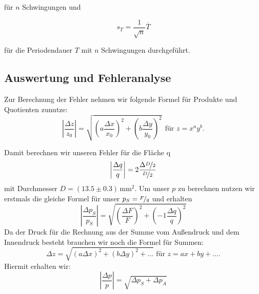 \documentclass[11pt,a4paper]{article}
\begin{document}
f\"ur $n$ Schwingungen und

\begin{equation}
s_T=\frac{1}{\sqrt{n}}\overline{T}\label{equt}
\end{equation}

f\"ur die Periodendauer $T$ mit $n$ Schwingungen durchgef\"uhrt.

\subsection{Auswertung und Fehleranalyse}

%

Zur Berechnung der Fehler nehmen wir folgende Formel f\"ur Produkte  und Quotienten zunutze:
\begin{equation}
\left\vert\frac{\Delta z}{z_0}\right\vert = \sqrt{\left({a\frac{\Delta x}{x_0}}\right)^2+\left({b\frac{\Delta y}{y_0}}\right)^2} \ \ \textrm{f\"ur } z=x^a y^b. 
\end{equation}

Damit berechnen wir unseren Fehler f\"ur die Fl\"ache q
\[
\left\vert\frac{\Delta q}{q}\right\vert=2\frac{\Delta\nicefrac{D}{2}}{\nicefrac{D}{2}}
\]
mit Durchmesser $D=(13.5\pm0.3)\,$mm$^2$.
Um unser $p$ zu berechnen nutzen wir erstmals die gleiche Formel f\"ur unser $p_S=\nicefrac{F}{q}$ und erhalten
\[
\left\vert\frac{\Delta p_S}{p_S}\right\vert=\sqrt{\left(\frac{\Delta F}{F}\right)^2+\left(-1\frac{\Delta q}{q}\right)^2}
\]
Da der Druck f\"ur die Rechnung aus der Summe vom Au\ss endruck und dem Innendruck besteht brauchen wir noch die Formel f\"ur Summen:
\begin{equation}
\Delta z = \sqrt{(a\Delta x)^2 + (b \Delta y)^2+\ldots} \textrm{  f\"ur } z = ax+by+\ldots.
\end{equation}
Hiermit erhalten wir:
\[
\left\vert\frac{\Delta p}{p}\right\vert=\sqrt{\Delta p_S+\Delta p_A}
\]

\end{document}
